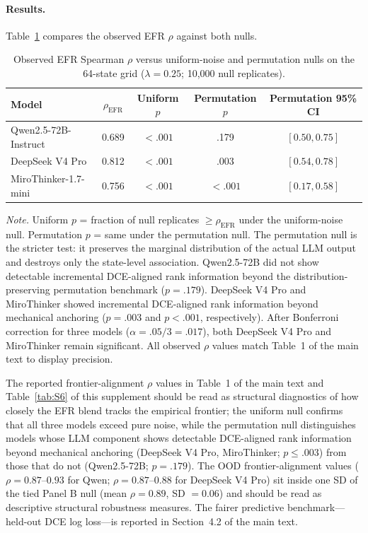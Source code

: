 \documentclass[11pt]{article}
\begin{document}
\paragraph{Results.} Table~\ref{tab:S1} compares the observed EFR $\rho$ against both nulls.

\begin{table}[h]
\centering
\caption{Observed EFR Spearman $\rho$ versus uniform-noise and permutation nulls on the 64-state grid ($\lambda = 0.25$; 10{,}000 null replicates).}
\label{tab:S1}
\small
\begin{tabular}{lcccc}
\toprule
Model & $\rho_{\text{EFR}}$ & Uniform $p$ & Permutation $p$ & Permutation 95\% CI \\
\midrule
Qwen2.5-72B-Instruct & 0.689 & $<.001$ & .179 & $[0.50, 0.75]$ \\
DeepSeek V4 Pro & 0.812 & $<.001$ & .003 & $[0.54, 0.78]$ \\
MiroThinker-1.7-mini & 0.756 & $<.001$ & $<.001$ & $[0.17, 0.58]$ \\
\bottomrule
\end{tabular}
\vspace{0.3em}
\begin{minipage}{0.92\textwidth}
\small
\textit{Note.} Uniform $p$ = fraction of null replicates $\geq \rho_{\text{EFR}}$ under the uniform-noise null. Permutation $p$ = same under the permutation null. The permutation null is the stricter test: it preserves the marginal distribution of the actual LLM output and destroys only the state-level association. Qwen2.5-72B did not show detectable incremental DCE-aligned rank information beyond the distribution-preserving permutation benchmark ($p = .179$). DeepSeek V4 Pro and MiroThinker showed incremental DCE-aligned rank information beyond mechanical anchoring ($p = .003$ and $p < .001$, respectively). After Bonferroni correction for three models ($\alpha = .05/3 = .017$), both DeepSeek V4 Pro and MiroThinker remain significant. All observed $\rho$ values match Table~1 of the main text to display precision.
\end{minipage}
\end{table}

The reported frontier-alignment $\rho$ values in Table~1 of the main text and Table~\ref{tab:S6} of this supplement should be read as structural diagnostics of how closely the EFR blend tracks the empirical frontier; the uniform null confirms that all three models exceed pure noise, while the permutation null distinguishes models whose LLM component shows detectable DCE-aligned rank information beyond mechanical anchoring (DeepSeek V4 Pro, MiroThinker; $p \leq .003$) from those that do not (Qwen2.5-72B; $p = .179$). The OOD frontier-alignment values ($\rho = 0.87$--$0.93$ for Qwen; $\rho = 0.87$--$0.88$ for DeepSeek V4 Pro) sit inside one SD of the tied Panel B null (mean $\rho = 0.89$, SD $= 0.06$) and should be read as descriptive structural robustness measures. The fairer predictive benchmark---held-out DCE log loss---is reported in Section~4.2 of the main text.
\end{document}
